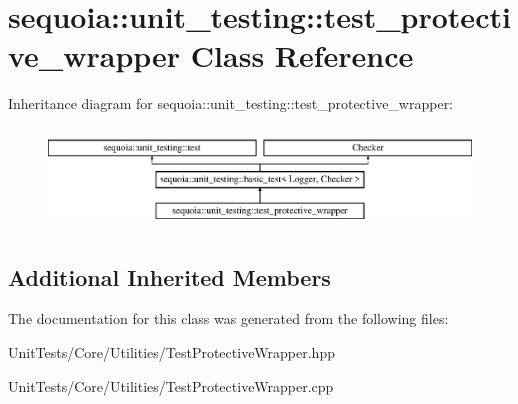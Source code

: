 \hypertarget{classsequoia_1_1unit__testing_1_1test__protective__wrapper}{}\section{sequoia\+::unit\+\_\+testing\+::test\+\_\+protective\+\_\+wrapper Class Reference}
\label{classsequoia_1_1unit__testing_1_1test__protective__wrapper}
Inheritance diagram for sequoia\+::unit\+\_\+testing\+::test\+\_\+protective\+\_\+wrapper\+:\begin{figure}[H]
\begin{center}
\leavevmode
\includegraphics[height=2.666667cm]{classsequoia_1_1unit__testing_1_1test__protective__wrapper}
\end{center}
\end{figure}
\subsection*{Additional Inherited Members}


The documentation for this class was generated from the following files\+:\begin{DoxyCompactItemize}
\item 
Unit\+Tests/\+Core/\+Utilities/Test\+Protective\+Wrapper.\+hpp\item 
Unit\+Tests/\+Core/\+Utilities/Test\+Protective\+Wrapper.\+cpp\end{DoxyCompactItemize}
